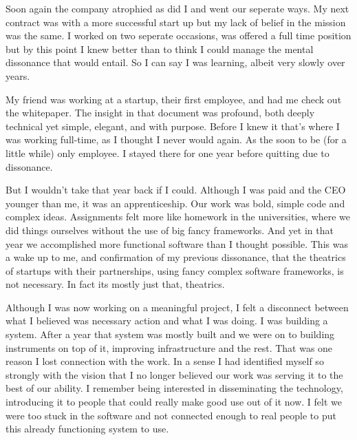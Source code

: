 Soon again the company atrophied as did I and went our seperate ways. My next contract was with a more successful start up but my lack of belief in the mission was the same. I worked on two seperate occasions, was offered a full time position but by this point I knew better than to think I could manage the mental dissonance that would entail. So I can say I was learning, albeit very slowly over years.

My friend was working at a startup, their first employee, and had me check out the whitepaper. The insight in that document was profound, both deeply technical yet simple, elegant, and with purpose. Before I knew it that's where I was working full-time, as I thought I never would again. As the soon to be (for a little while) only employee. I stayed there for one year before quitting due to dissonance.

But I wouldn't take that year back if I could. Although I was paid and the CEO younger than me, it was an apprenticeship. Our work was bold, simple code and complex ideas. Assignments felt more like homework in the universities, where we did things ourselves without the use of big fancy frameworks. And yet in that year we accomplished more functional software than I thought possible. This was a wake up to me, and confirmation of my previous dissonance, that the theatrics of startups with their partnerships, using fancy complex software frameworks, is not necessary. In fact its mostly just that, theatrics.

Although I was now working on a meaningful project, I felt a disconnect between what I believed was necessary action and what I was doing. I was building a system. After a year that system was mostly built and we were on to building instruments on top of it, improving infrastructure and the rest. That was one reason I lost connection with the work. In a sense I had identified myself so strongly with the vision that I no longer believed our work was serving it to the best of our ability. I remember being interested in disseminating the technology, introducing it to people that could really make good use out of it now. I felt we were too stuck in the software and not connected enough to real people to put this already functioning system to use.
